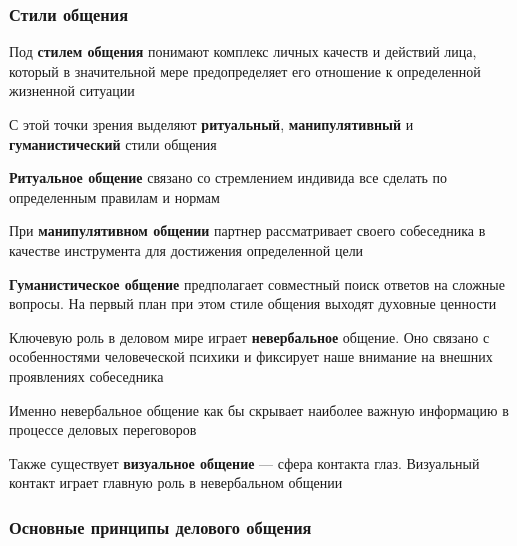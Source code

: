 \subsubsection{Стили общения}

\begin{definition}
    Под \textbf{стилем общения} понимают комплекс личных качеств и действий лица, который в значительной мере предопределяет его отношение к определенной жизненной ситуации
\end{definition}

С этой точки зрения выделяют \textbf{ритуальный}, \textbf{манипулятивный} и \textbf{гуманистический} стили общения

\hfill

\textbf{Ритуальное общение} связано со стремлением индивида все сделать по определенным правилам и нормам

При \textbf{манипулятивном общении} партнер рассматривает своего собеседника в качестве инструмента для достижения определенной цели

\textbf{Гуманистическое общение} предполагает совместный поиск ответов на сложные вопросы. На первый план при этом стиле общения выходят духовные ценности

\hfill

Ключевую роль в деловом мире играет \textbf{невербальное} общение. Оно связано с особенностями человеческой психики и фиксирует наше внимание на внешних проявлениях собеседника

Именно невербальное общение как бы скрывает наиболее важную информацию в процессе деловых переговоров

Также существует \textbf{визуальное общение} — сфера контакта глаз. Визуальный контакт играет главную роль в невербальном общении

\subsubsection{Основные принципы делового общения}


\begin{multienumerate}
\end{multienumerate}

